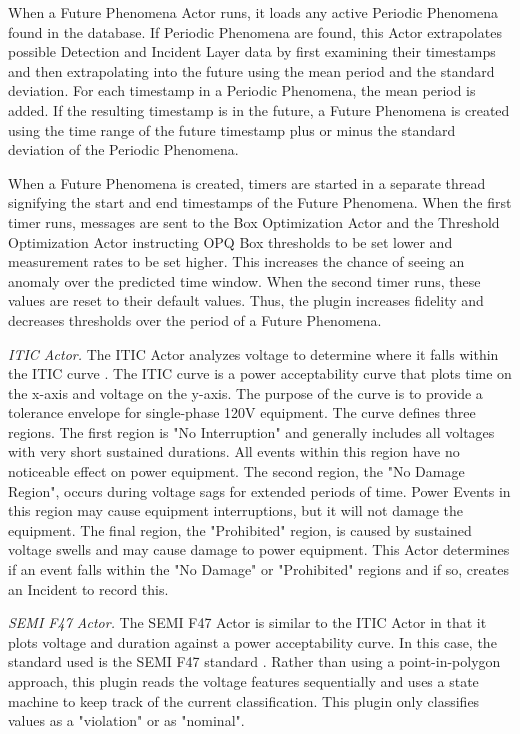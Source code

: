When a Future Phenomena Actor runs, it loads any active Periodic Phenomena found in the database. If Periodic Phenomena are found, this Actor extrapolates possible Detection and Incident Layer data by first examining their timestamps and then extrapolating into the future using the mean period and the standard deviation. For each timestamp in a Periodic Phenomena, the mean period is added. If the resulting timestamp is in the future, a Future Phenomena is created using the time range of the future timestamp plus or minus the standard deviation of the Periodic Phenomena.

When a Future Phenomena is created, timers are started in a separate thread signifying the start and end timestamps of the Future Phenomena. When the first timer runs, messages are sent to the Box Optimization Actor and the Threshold Optimization Actor instructing OPQ Box thresholds to be set lower and measurement rates to be set higher. This increases the chance of seeing an anomaly over the predicted time window. When the second timer runs, these values are reset to their default values. Thus, the plugin increases fidelity and decreases thresholds over the period of a Future Phenomena.

{\em ITIC Actor.} The ITIC Actor analyzes voltage to determine where it falls within the ITIC curve \cite{thallam_power_2000}. The ITIC curve is a power acceptability curve that plots time on the x-axis and voltage on the y-axis.  The purpose of the curve is to provide a tolerance envelope for single-phase 120V equipment. The curve defines three regions. The first region is "No Interruption" and generally includes all voltages with very short sustained durations. All events within this region have no noticeable effect on power equipment. The second region, the "No Damage Region", occurs during voltage sags for extended periods of time. Power Events in this region may cause equipment interruptions, but it will not damage the equipment. The final region, the "Prohibited" region, is caused by sustained voltage swells and may cause damage to power equipment. This Actor determines if an event falls within the "No Damage" or "Prohibited" regions and if so, creates an Incident to record this.

{\em SEMI F47 Actor.} The SEMI F47 Actor is similar to the ITIC Actor in that it plots voltage and duration against a power acceptability curve. In this case, the standard used is the SEMI F47 standard \cite{djokic_sensitivity_2005}. Rather than using a point-in-polygon approach, this plugin reads the voltage features sequentially and uses a state machine to keep track of the current classification. This plugin only classifies values as a "violation" or as "nominal".


